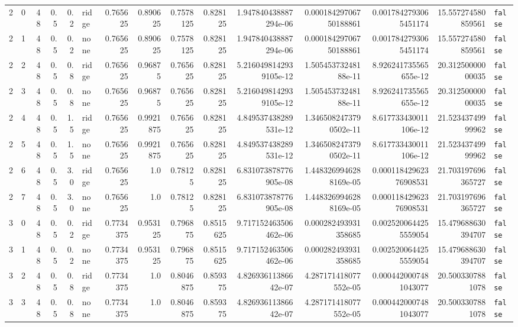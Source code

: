 \documentclass[11pt,a4paper]{article}
\begin{document}
\begin{landscape}
\begin{longtable}{r r r r r l r r r r r r r r l}
2 & 0 & 48 & 0.5 & 0.2 & ridge & 0.765625 & 0.890625 & 0.7578125 & 0.828125 & 1.947840438887294e-06 & 0.00018429706750188861 & 0.0017842793065451174 & 15.557274580859561 & \texttt{false} \\
2 & 1 & 48 & 0.5 & 0.2 & none & 0.765625 & 0.890625 & 0.7578125 & 0.828125 & 1.947840438887294e-06 & 0.00018429706750188861 & 0.0017842793065451174 & 15.557274580859561 & \texttt{false} \\
2 & 2 & 48 & 0.5 & 0.8 & ridge & 0.765625 & 0.96875 & 0.765625 & 0.828125 & 5.2160498142939105e-12 & 1.50545373248188e-11 & 8.926241735565655e-12 & 20.31250000000035 & \texttt{false} \\
2 & 3 & 48 & 0.5 & 0.8 & none & 0.765625 & 0.96875 & 0.765625 & 0.828125 & 5.2160498142939105e-12 & 1.50545373248188e-11 & 8.926241735565655e-12 & 20.31250000000035 & \texttt{false} \\
2 & 4 & 48 & 0.5 & 1.5 & ridge & 0.765625 & 0.9921875 & 0.765625 & 0.828125 & 4.849537438289531e-12 & 1.3465082473790502e-11 & 8.617733430011106e-12 & 21.52343749999962 & \texttt{false} \\
2 & 5 & 48 & 0.5 & 1.5 & none & 0.765625 & 0.9921875 & 0.765625 & 0.828125 & 4.849537438289531e-12 & 1.3465082473790502e-11 & 8.617733430011106e-12 & 21.52343749999962 & \texttt{false} \\
2 & 6 & 48 & 0.5 & 3.0 & ridge & 0.765625 & 1.0 & 0.78125 & 0.828125 & 6.831073878776905e-08 & 1.4483269946288169e-05 & 0.00011842962376908531 & 21.703197696365727 & \texttt{false} \\
2 & 7 & 48 & 0.5 & 3.0 & none & 0.765625 & 1.0 & 0.78125 & 0.828125 & 6.831073878776905e-08 & 1.4483269946288169e-05 & 0.00011842962376908531 & 21.703197696365727 & \texttt{false} \\
3 & 0 & 48 & 0.5 & 0.2 & ridge & 0.7734375 & 0.953125 & 0.796875 & 0.8515625 & 9.717152463506462e-06 & 0.000282493931358685 & 0.0025200644255559054 & 15.479688630394707 & \texttt{false} \\
3 & 1 & 48 & 0.5 & 0.2 & none & 0.7734375 & 0.953125 & 0.796875 & 0.8515625 & 9.717152463506462e-06 & 0.000282493931358685 & 0.0025200644255559054 & 15.479688630394707 & \texttt{false} \\
3 & 2 & 48 & 0.5 & 0.8 & ridge & 0.7734375 & 1.0 & 0.8046875 & 0.859375 & 4.82693611386642e-07 & 4.287171418077552e-05 & 0.0004420007481043077 & 20.5003307881078 & \texttt{false} \\
3 & 3 & 48 & 0.5 & 0.8 & none & 0.7734375 & 1.0 & 0.8046875 & 0.859375 & 4.82693611386642e-07 & 4.287171418077552e-05 & 0.0004420007481043077 & 20.5003307881078 & \texttt{false} \\

\end{longtable}
\end{landscape}
\end{document}
